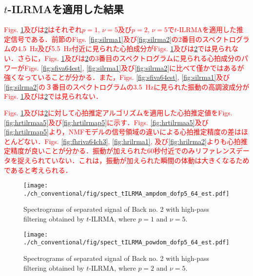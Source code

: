 \subsection{$t$-ILRMAを適用した結果}
\label{sec:conv:resulttilrma}
\textcolor{red}{Figs. \ref{fig:stilrmaa5}及びは\ref{fig:stilrmap5}はそれぞれ$p=1$, $\nu = 5$及び$p=2$, $\nu = 5$で$t$-ILRMAを適用した推定信号である．前節のFigs. \ref{fig:silrma1}及び\ref{fig:silrma2}の2番目のスペクトログラムの4.5~Hz及び5.5~Hz付近に見られた心拍成分がFigs. \ref{fig:stilrmaa5}及びは\ref{fig:stilrmap5}では見られない．さらに，Figs. \ref{fig:stilrmaa5}及びは\ref{fig:stilrmap5}の3番目のスペクトログラムに見られる心拍成分のパワーがFigs. \ref{fig:sfiva64est}, \ref{fig:silrma1}及び\ref{fig:silrma2}に比べて僅かではあるが強くなっていることが分かる．また，Figs. \ref{fig:sfiva64est}, \ref{fig:silrma1}及び\ref{fig:silrma2}の３番目のスペクトログラムの3.5~Hzに見られた振動の高調波成分がFigs. \ref{fig:stilrmaa5}及びは\ref{fig:stilrmap5}では見られない．}

\textcolor{red}{Figs. \ref{fig:stilrmaa5}及びは\ref{fig:stilrmap5}に対して心拍推定アルゴリズムを適用した心拍推定値をFigs. \ref{fig:hrtilrmaa5}及び\ref{fig:hrtilrmap5}に示す．Figs. \ref{fig:hrtilrmaa5}及び\ref{fig:hrtilrmap5}より，NMFモデルの信号領域の違いによる心拍推定精度の差はほとんどない．Figs. \ref{fig:fhriva64ch3}, \ref{fig:hrilrma1}, 及び\ref{fig:hrilrma2}よりも心拍推定精度が良いことが分かる．振動が加えられた60秒付近でのみリファレンスデータを捉えられていない．これは，振動が加えられた瞬間の体動は大きくなるためであると考えられる．}

\begin{figure}[tb]
\centering
\texttt{[image: ./ch\_conventional/fig/spect\_tILRMA\_ampdom\_dofp5\_64\_est.pdf]}
\caption{Spectrograms of separated signal of Back no. 2 with high-pass filtering obtained by $t$-ILRMA, where $p=1$ and $\nu=5$.}
\label{fig:stilrmaa5}
\end{figure}

\begin{figure}[tb]
\centering
\texttt{[image: ./ch\_conventional/fig/spect\_tILRMA\_powdom\_dofp5\_64\_est.pdf]}
\caption{Spectrograms of separated signal of Back no. 2 with high-pass filtering obtained by $t$-ILRMA, where $p=2$ and $\nu=5$.}
\label{fig:stilrmap5}
\end{figure}

